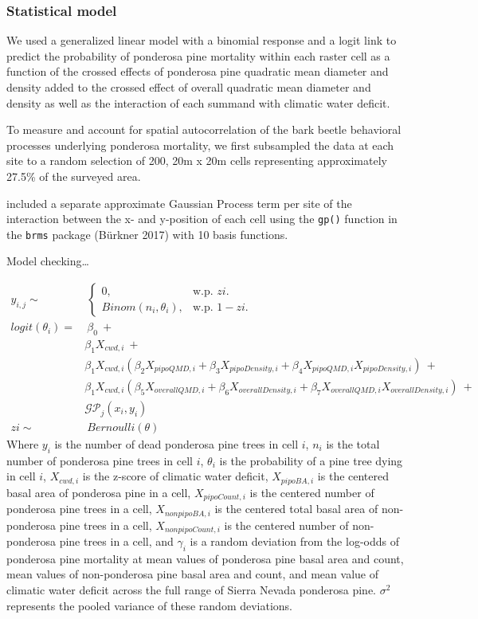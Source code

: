 \documentclass[]{article}
\begin{document}
\subsubsection{Statistical model}\label{statistical-model}

We used a generalized linear model with a binomial response and a logit
link to predict the probability of ponderosa pine mortality within each
raster cell as a function of the crossed effects of ponderosa pine
quadratic mean diameter and density added to the crossed effect of
overall quadratic mean diameter and density as well as the interaction
of each summand with climatic water deficit.

To measure and account for spatial autocorrelation of the bark beetle
behavioral processes underlying ponderosa mortality, we first subsampled
the data at each site to a random selection of 200, 20m x 20m cells
representing approximately 27.5\% of the surveyed area.

included a separate approximate Gaussian Process term per site of the
interaction between the x- and y-position of each cell using the
\texttt{gp()} function in the \texttt{brms} package (Bürkner 2017) with
10 basis functions.

Model checking\ldots{}

\[
\begin{aligned}
y_{i,j} \sim &\ \begin{cases}
    0, & \text{w.p. $zi$}.\\
    Binom(n_i, \theta_i), & \text{w.p. $1-zi$}.
  \end{cases} \\
logit(\theta_i) = &\ \beta_0\ + \\
& \beta_1X_{cwd, i}\ + \\
& \beta_1X_{cwd, i}(\beta_2X_{pipoQMD, i} + \beta_3X_{pipoDensity, i} + \beta_4X_{pipoQMD, i}X_{pipoDensity, i})\ + \\ 
& \beta_1X_{cwd, i}(\beta_5X_{overallQMD, i} + \beta_6X_{overallDensity, i} + \beta_7X_{overallQMD, i}X_{overallDensity, i})\ + \\
& \mathcal{GP}_j(x_i, y_i) \\
zi \sim &\ Bernoulli(\theta)
\end{aligned}
\] Where \(y_i\) is the number of dead ponderosa pine trees in cell
\(i\), \(n_i\) is the total number of ponderosa pine trees in cell
\(i\), \(\theta_i\) is the probability of a pine tree dying in cell
\(i\), \(X_{cwd, i}\) is the z-score of climatic water deficit,
\(X_{pipoBA, i}\) is the centered basal area of ponderosa pine in a
cell, \(X_{pipoCount, i}\) is the centered number of ponderosa pine
trees in a cell, \(X_{nonpipoBA, i}\) is the centered total basal area
of non-ponderosa pine trees in a cell, \(X_{nonpipoCount, i}\) is the
centered number of non-ponderosa pine trees in a cell, and \(\gamma_i\)
is a random deviation from the log-odds of ponderosa pine mortality at
mean values of ponderosa pine basal area and count, mean values of
non-ponderosa pine basal area and count, and mean value of climatic
water deficit across the full range of Sierra Nevada ponderosa pine.
\(\sigma^2\) represents the pooled variance of these random deviations.
\end{document}
